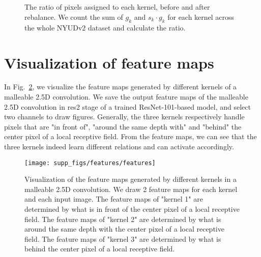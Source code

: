 \documentclass[runningheads]{llncs}
\begin{document}
\begin{figure}[htbp]
  \centering
  \\
  \\
  \\
  \\
  \caption{
    The ratio of pixels assigned to each kernel, before and after rebalance.
    We count the sum of $g_k$ and $s_k\cdot g_k$ for each kernel across the whole NYUDv2 dataset and calculate the ratio.
  }
  \label{fig:rebalance}
\end{figure}

\section{Visualization of feature maps}
In Fig.~\ref{fig:features}, we visualize the feature maps generated by different kernels of a malleable 2.5D convolution.
We save the output feature maps of the malleable 2.5D convolution in res2 stage of a trained ResNet-101-based model, and select two channels to draw figures.
Generally, the three kernels respectively handle pixels that are "in front of", "around the same depth with" and "behind" the center pixel of a local receptive field.
From the feature maps, we can see that the three kernels indeed learn different relations and can activate accordingly.

\begin{figure}[htbp]
  \centering
  \texttt{[image: supp\_figs/features/features]}
  \caption{
  Visualization of the feature maps generated by different kernels in a malleable 2.5D convolution.
  We draw 2 feature maps for each kernel and each input image.
  The feature maps of "kernel 1" are determined by what is in front of the center pixel of a local receptive field.
  The feature maps of "kernel 2" are determined by what is around the same depth with the center pixel of a local receptive field.
  The feature maps of "kernel 3" are determined by what is behind the center pixel of a local receptive field.
  }
  \label{fig:features}
\end{figure}
\end{document}
